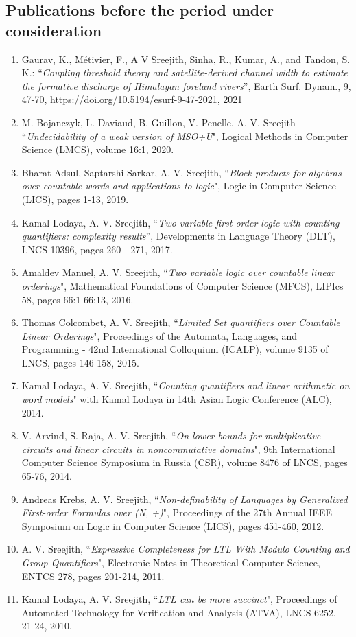 \documentclass[margin]{res}
\begin{document}
\begin{resume}
\section{Publications before the period under consideration}
\begin{enumerate}
\item Gaurav, K., Métivier, F., A V Sreejith, Sinha, R., Kumar, A., and Tandon, S. K.: ``\emph{Coupling threshold theory and satellite-derived channel width to estimate the formative discharge of Himalayan foreland rivers}'', Earth Surf. Dynam., 9, 47-70, https://doi.org/10.5194/esurf-9-47-2021, 2021
\item M. Bojanczyk, L. Daviaud, B. Guillon, V. Penelle, A. V. Sreejith ``\emph{Undecidability of a weak version of MSO+U}", Logical Methods in Computer Science (LMCS), volume 16:1, 2020.
\item Bharat Adsul, Saptarshi Sarkar, A. V. Sreejith, ``\emph{Block products for algebras over countable words and applications to logic}", Logic in Computer Science (LICS), pages 1-13, 2019.
\item Kamal Lodaya, A. V. Sreejith, ``\emph{Two variable first order logic with counting quantifiers: complexity results}'', Developments in Language Theory (DLT), LNCS 10396, pages 260 - 271, 2017.
\item Amaldev Manuel, A. V. Sreejith, ``\emph{Two variable logic over countable linear orderings}", Mathematical Foundations of Computer Science (MFCS), LIPIcs 58, pages 66:1-66:13, 2016. 
\item Thomas Colcombet, A. V. Sreejith, ``\emph{Limited Set quantifiers over Countable Linear Orderings}", Proceedings of the Automata, Languages, and Programming - 42nd International Colloquium (ICALP), volume 9135 of LNCS, pages 146-158, 2015. 
\item Kamal Lodaya, A. V. Sreejith, ``\emph{Counting quantifiers and linear arithmetic on word models}" with Kamal Lodaya in 14th Asian Logic Conference (ALC), 2014.
\item V. Arvind, S. Raja, A. V. Sreejith, ``\emph{On lower bounds for multiplicative circuits and linear circuits in noncommutative domains}", 9th International Computer Science Symposium in Russia (CSR), volume 8476 of LNCS, pages 65-76, 2014.
\item Andreas Krebs, A. V. Sreejith, ``\emph{Non-definability of Languages by Generalized First-order Formulas over (N, +)}", Proceedings of the 27th Annual IEEE Symposium on Logic in Computer Science (LICS),  pages 451-460, 2012.
\item A. V. Sreejith, ``\emph{Expressive Completeness for LTL With Modulo Counting and Group Quantifiers}", Electronic Notes in Theoretical Computer Science, ENTCS 278, pages 201-214, 2011.
\item Kamal Lodaya, A. V. Sreejith, ``\emph{LTL can be more succinct}", Proceedings of Automated Technology for Verification and Analysis (ATVA), LNCS 6252, 21-24, 2010.
\end{enumerate}

\end{resume}
\end{document}
